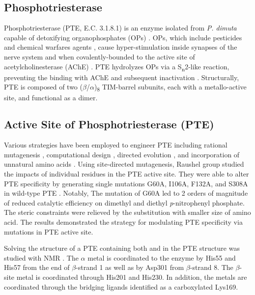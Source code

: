 \begin{refsection}
\subsection{Phosphotriesterase}

Phosphotriesterase (PTE, E.C. 3.1.8.1) is an enzyme isolated from \emph{P.
dimuta} capable of detoxifying organophosphates (OPs) \cite{
Lewis1988,Chen2007a,Mulbry1989,Benning2001a,Omburo1992a,Benning1995,Naqvi2014}.
OPs, which include pesticides\cite{Amaroli2013b,Ross2013b} and chemical
warfares agents \cite{Tsai2012b,Colovic2013b}, cause hyper-stimulation inside
synapses of the nerve system and when covalently-bounded to the active site of
acetylcholinesterase (AChE) \cite{Lopez-Granero2013c}. PTE hydrolyzes OPs via a
S\textsubscript{n}2-like reaction, preventing the binding with AChE and
subsequent inactivation \cite{Ghanem2005a}. Structurally, PTE is composed of two
($\beta$/$\alpha$)\textsubscript{8} TIM-barrel subunits, each with a
metallo-active site, and functional as a dimer.

\subsection{Active Site of Phosphotriesterase (PTE)}

Various strategies have been employed to engineer PTE including rational
mutagenesis \cite{Chen-Goodspeed2001a,Jackson2009a}, computational
design \cite{Pavelka2009,Yang2014a}, directed evolution \cite{Roodveldt2005}, and
incorporation of unnatural amino acids \cite{Yang2014a,Baker2011b}. Using
site-directed mutagenesis, Raushel group studied the impacts of
individual residues in the PTE active site. They were able to alter PTE
specificity by generating single mutations G60A, I106A, F132A, and
S308A in wild-type PTE \cite{Chen-Goodspeed2001a}. Notably, The mutation of
G60A led to 2 orders of magnitude of reduced catalytic efficiency on dimethyl
and diethyl \emph{p}-nitrophenyl phosphate. The steric constraints were
relieved by the substitution with smaller size of amino acid. The results
demonstrated the strategy for modulating PTE specificity via mutations in PTE
active site. 

Solving the structure of a PTE containing both  and
 in the PTE structure was studied with NMR \cite{Benning2001a}. The
$\alpha$ metal is coordinated to the enzyme by His55 and His57 from the
end of $\beta$-strand 1 as well as by Asp301 from $\beta$-strand 8. The
$\beta$-site metal is coordinated through His201 and His230. In addition, the
metals are coordinated through the bridging ligands identified as a
carboxylated Lys169.


\end{refsection}
